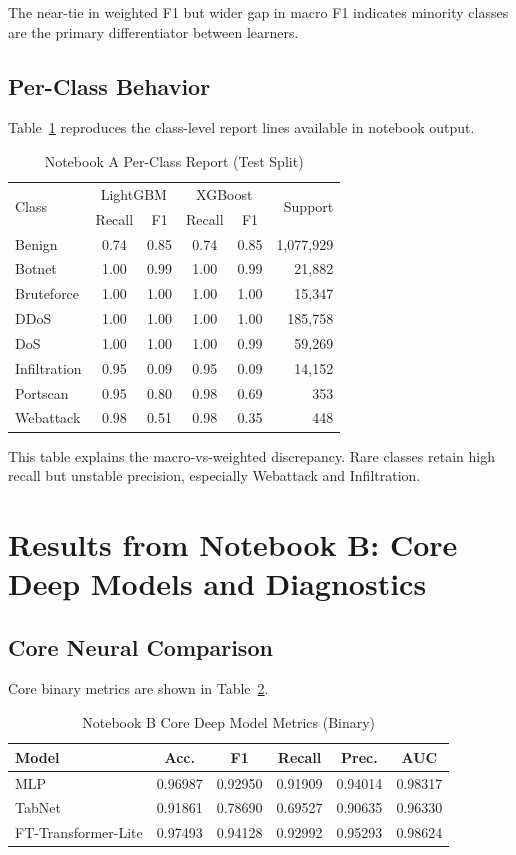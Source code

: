 \documentclass[10pt,journal]{IEEEtran}
\begin{document}
The near-tie in weighted F1 but wider gap in macro F1 indicates minority classes are the primary differentiator between learners.

\subsection{Per-Class Behavior}
Table~\ref{tab:gb_perclass} reproduces the class-level report lines available in notebook output.

\begin{table}[!t]
\caption{Notebook A Per-Class Report (Test Split)}
\label{tab:gb_perclass}
\centering
\begin{tabular}{l c c c c r}
\toprule
\multirow{2}{*}{Class} & \multicolumn{2}{c}{LightGBM} & \multicolumn{2}{c}{XGBoost} & \multirow{2}{*}{Support} \\
 & Recall & F1 & Recall & F1 & \\
\midrule
Benign & 0.74 & 0.85 & 0.74 & 0.85 & 1,077,929 \\
Botnet & 1.00 & 0.99 & 1.00 & 0.99 & 21,882 \\
Bruteforce & 1.00 & 1.00 & 1.00 & 1.00 & 15,347 \\
DDoS & 1.00 & 1.00 & 1.00 & 1.00 & 185,758 \\
DoS & 1.00 & 1.00 & 1.00 & 0.99 & 59,269 \\
Infiltration & 0.95 & 0.09 & 0.95 & 0.09 & 14,152 \\
Portscan & 0.95 & 0.80 & 0.98 & 0.69 & 353 \\
Webattack & 0.98 & 0.51 & 0.98 & 0.35 & 448 \\
\bottomrule
\end{tabular}
\end{table}

This table explains the macro-vs-weighted discrepancy. Rare classes retain high recall but unstable precision, especially Webattack and Infiltration.

\section{Results from Notebook B: Core Deep Models and Diagnostics}
\subsection{Core Neural Comparison}
Core binary metrics are shown in Table~\ref{tab:dl_core}.

\begin{table}[!t]
\caption{Notebook B Core Deep Model Metrics (Binary)}
\label{tab:dl_core}
\centering
\begin{tabular}{lccccc}
\toprule
Model & Acc. & F1 & Recall & Prec. & AUC \\
\midrule
MLP & 0.96987 & 0.92950 & 0.91909 & 0.94014 & 0.98317 \\
TabNet & 0.91861 & 0.78690 & 0.69527 & 0.90635 & 0.96330 \\
FT-Transformer-Lite & 0.97493 & 0.94128 & 0.92992 & 0.95293 & 0.98624 \\
\bottomrule
\end{tabular}
\end{table}
\end{document}
